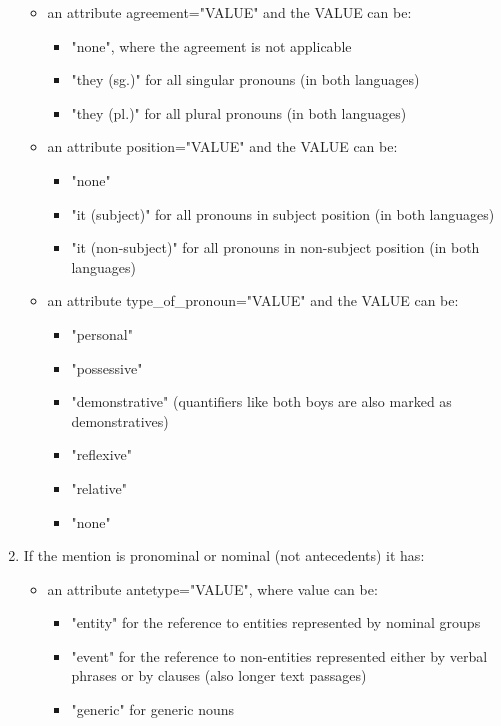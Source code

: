 \documentclass[a4paper]{article}
\begin{document}
\begin{enumerate}
\begin{itemize}
 \item an attribute agreement="VALUE" and the VALUE can be:
 \begin{itemize}
 \item  "none", where the agreement is not applicable
  \item "they (sg.)" for all singular pronouns (in both languages)
\item "they (pl.)" for all plural pronouns (in both languages)
 \end{itemize}
 
 \item an attribute position="VALUE"  and the VALUE can be:
 \begin{itemize}
 \item  "none"
  \item "it (subject)" for all pronouns in subject position (in both languages)
\item "it (non-subject)" for all pronouns in non-subject position (in both languages)
 \end{itemize}
 
 \item an attribute type\_of\_pronoun="VALUE" and the VALUE can be:
 \begin{itemize}
 \item "personal"
 \item "possessive"
 \item "demonstrative" (quantifiers like both boys are also marked as demonstratives)
 \item "reflexive"
 \item "relative"
 \item "none"
 \end{itemize}

\end{itemize}

\item If the mention is pronominal or nominal (not antecedents) it has:
\begin{itemize}
\item an attribute antetype="VALUE", where value can be:
\begin{itemize}
\item "entity" for the reference to entities represented by nominal groups
\item "event" for the reference to non-entities represented either by verbal phrases or by clauses (also longer text passages)
\item "generic" for generic nouns
\end{itemize}
 

\end{itemize}
\end{enumerate}
\end{document}
